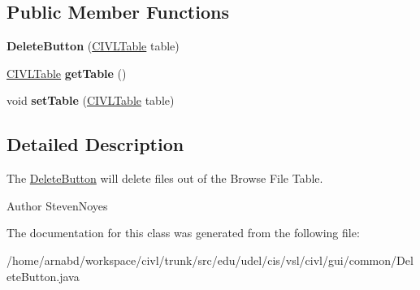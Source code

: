 \subsection*{Public Member Functions}
\begin{DoxyCompactItemize}
\item 
\hypertarget{classedu_1_1udel_1_1cis_1_1vsl_1_1civl_1_1gui_1_1common_1_1DeleteButton_af84057bf02fdcba0f3d14a923034a09b}{}{\bfseries Delete\+Button} (\hyperlink{classedu_1_1udel_1_1cis_1_1vsl_1_1civl_1_1gui_1_1common_1_1CIVLTable}{C\+I\+V\+L\+Table} table)\label{classedu_1_1udel_1_1cis_1_1vsl_1_1civl_1_1gui_1_1common_1_1DeleteButton_af84057bf02fdcba0f3d14a923034a09b}

\item 
\hypertarget{classedu_1_1udel_1_1cis_1_1vsl_1_1civl_1_1gui_1_1common_1_1DeleteButton_a1a8edd3acac588fad806b7354a35f03a}{}\hyperlink{classedu_1_1udel_1_1cis_1_1vsl_1_1civl_1_1gui_1_1common_1_1CIVLTable}{C\+I\+V\+L\+Table} {\bfseries get\+Table} ()\label{classedu_1_1udel_1_1cis_1_1vsl_1_1civl_1_1gui_1_1common_1_1DeleteButton_a1a8edd3acac588fad806b7354a35f03a}

\item 
\hypertarget{classedu_1_1udel_1_1cis_1_1vsl_1_1civl_1_1gui_1_1common_1_1DeleteButton_aa0a4bc19015b4db8051a8e7f6b3d6a87}{}void {\bfseries set\+Table} (\hyperlink{classedu_1_1udel_1_1cis_1_1vsl_1_1civl_1_1gui_1_1common_1_1CIVLTable}{C\+I\+V\+L\+Table} table)\label{classedu_1_1udel_1_1cis_1_1vsl_1_1civl_1_1gui_1_1common_1_1DeleteButton_aa0a4bc19015b4db8051a8e7f6b3d6a87}

\end{DoxyCompactItemize}


\subsection{Detailed Description}
The \hyperlink{classedu_1_1udel_1_1cis_1_1vsl_1_1civl_1_1gui_1_1common_1_1DeleteButton}{Delete\+Button} will delete files out of the Browse File Table. 

\begin{DoxyAuthor}{Author}
Steven\+Noyes 
\end{DoxyAuthor}


The documentation for this class was generated from the following file\+:\begin{DoxyCompactItemize}
\item 
/home/arnabd/workspace/civl/trunk/src/edu/udel/cis/vsl/civl/gui/common/Delete\+Button.\+java\end{DoxyCompactItemize}
